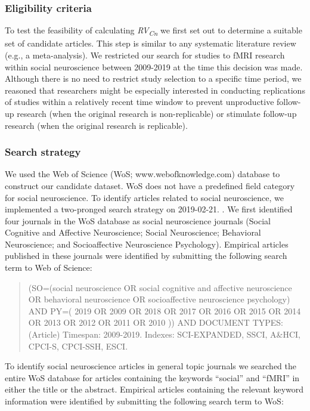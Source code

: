 \documentclass[
  man,floatsintext]{apa6}
\begin{document}
\hypertarget{eligibility-criteria}{%
\subsubsection{Eligibility criteria}\label{eligibility-criteria}}

To test the feasibility of calculating \emph{RV\textsubscript{Cn}} we first set out to determine a suitable set of candidate articles. This step is similar to any systematic literature review (e.g., a meta-analysis). We restricted our search for studies to fMRI research within social neuroscience between 2009-2019 at the time this decision was made. Although there is no need to restrict study selection to a specific time period, we reasoned that researchers might be especially interested in conducting replications of studies within a relatively recent time window to prevent unproductive follow-up research (when the original research is non-replicable) or stimulate follow-up research (when the original research is replicable).

\hypertarget{search-strategy}{%
\subsubsection{Search strategy}\label{search-strategy}}

We used the Web of Science (WoS; www.webofknowledge.com) database to construct our candidate dataset. WoS does not have a predefined field category for social neuroscience. To identify articles related to social neuroscience, we implemented a two-pronged search strategy on 2019-02-21. . We first identified four journals in the WoS database as social neuroscience journals (Social Cognitive and Affective Neuroscience; Social Neuroscience; Behavioral Neuroscience; and Socioaffective Neuroscience Psychology). Empirical articles published in these journals were identified by submitting the following search term to Web of Science:

\begin{quote}
(SO=(social neuroscience OR social cognitive and affective neuroscience OR behavioral neuroscience OR socioaffective neuroscience psychology) AND PY=( 2019 OR 2009 OR 2018 OR 2017 OR 2016 OR 2015 OR 2014 OR 2013 OR 2012 OR 2011 OR 2010 )) AND DOCUMENT TYPES: (Article)
Timespan: 2009-2019. Indexes: SCI-EXPANDED, SSCI, A\&HCI, CPCI-S, CPCI-SSH, ESCI.
\end{quote}

To identify social neuroscience articles in general topic journals we searched the entire WoS database for articles containing the keywords ``social'' and ``fMRI'' in either the title or the abstract. Empirical articles containing the relevant keyword information were identified by submitting the following search term to WoS:
\end{document}
